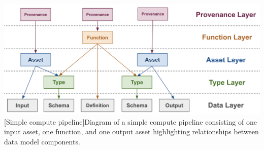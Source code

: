 \documentclass[9pt, oneside]{article}   	%
\begin{document}
\begin{multicols}{2}

\end{multicols}
\begin{center}
    
\includegraphics[width=1\columnwidth]{pipeline_layers_20230715}
[Simple compute pipeline]{Diagram of a simple compute pipeline consisting of one input asset, one function, and one output asset highlighting relationships between data model components.}
\label{simplePipeline}
\end{center}
\begin{multicols}{2}

{}


\end{multicols}
\end{document}
